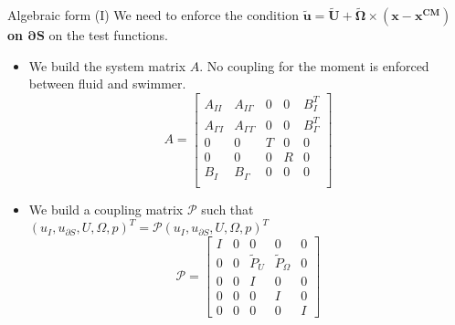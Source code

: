 \documentclass{beamer}
\begin{document}
		\begin{frame}{Algebraic form (I)}
			We need to enforce the condition $\mathbf{\tilde{u}=\tilde{U}+\tilde{\Omega}\times (x-x^{CM})} $ \textbf{on $\mathbf{\partial S}$ }on the test functions.
			\begin{itemize}
			\item We build the system matrix $A$. No coupling for the moment is enforced between fluid and swimmer.
			\begin{equation*}
			A = 
			\begin{bmatrix}
			A_{II} & A_{I\Gamma} & 0 & 0 & B_{I}^T  \\
			A_{\Gamma I} & A_{\Gamma \Gamma}  & 0 & 0 & B_{\Gamma}^T\\
			0 & 0 & T & 0 & 0 \\
			0 & 0 & 0& R & 0\\
			B_I & B_\Gamma & 0 & 0 & 0   \\
			\end{bmatrix}
			\end{equation*}
			\item We build a coupling matrix $\mathcal{P}$ such that $(u_I,u_{\partial S},U,\Omega,p)^T = \mathcal{P} (u_I,u_{\partial S},U,\Omega,p)^T$
			\begin{equation*}
			\mathcal{P} =
			\begin{bmatrix}
			I & 0 & 0 & 0 & 0\\
			0 &  0 & \tilde{P}_U & \tilde{P}_\Omega& 0\\
			0 & 0 & I & 0 & 0\\
			0 & 0 & 0 & I & 0\\
			0 & 0& 0& 0& I
			\end{bmatrix}
			\end{equation*}
			\end{itemize}
		\end{frame}
\end{document}
